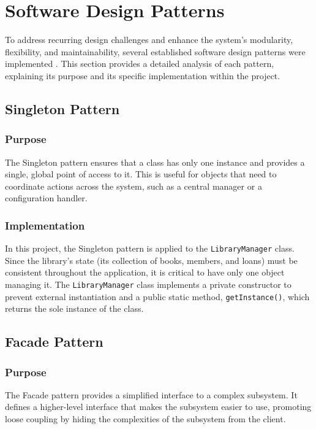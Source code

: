 \section{Software Design Patterns}
\label{sec:design_patterns}

To address recurring design challenges and enhance the system's modularity, flexibility, and maintainability, several established software design patterns were implemented \cite{GoF1994}. This section provides a detailed analysis of each pattern, explaining its purpose and its specific implementation within the project.

\subsection{Singleton Pattern}
\subsubsection{Purpose}
The Singleton pattern ensures that a class has only one instance and provides a single, global point of access to it. This is useful for objects that need to coordinate actions across the system, such as a central manager or a configuration handler.

\subsubsection{Implementation}
In this project, the Singleton pattern is applied to the \texttt{LibraryManager} class. Since the library's state (its collection of books, members, and loans) must be consistent throughout the application, it is critical to have only one object managing it. The \texttt{LibraryManager} class implements a private constructor to prevent external instantiation and a public static method, \texttt{getInstance()}, which returns the sole instance of the class.

\subsection{Facade Pattern}
\subsubsection{Purpose}
The Facade pattern provides a simplified interface to a complex subsystem. It defines a higher-level interface that makes the subsystem easier to use, promoting loose coupling by hiding the complexities of the subsystem from the client.

